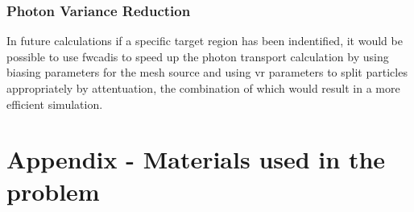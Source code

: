 \documentclass[12pt]{article}
\begin{document}
\subsubsection*{Photon Variance Reduction}
In future calculations if a specific target region has been indentified, it
would be possible to use \gls{fwcadis} to speed up the photon transport
calculation by using biasing parameters for the mesh source and using \gls{vr}
parameters to split particles appropriately by attentuation, the combination
of which would result in a more efficient simulation.

\newpage
\clearpage


\newpage
\clearpage

\setcounter{section}{0}
\renewcommand{\thesection}{\Alph{section}}
\renewcommand*\theHsection{appendixsection.\Alph{section}}
\section{Appendix - Materials used in the problem}
\label{appendix_a}

\newpage
\clearpage
\end{document}

